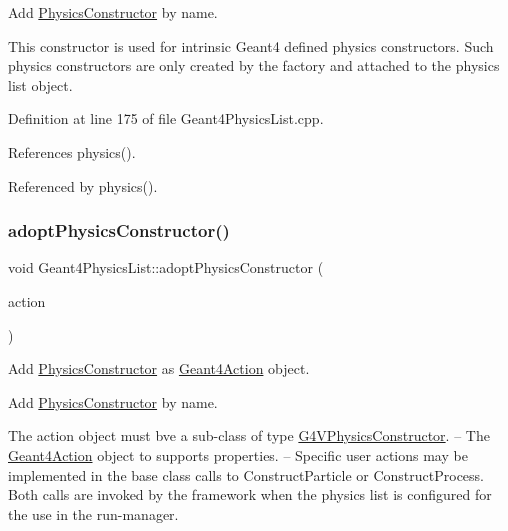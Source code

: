 Add \hyperlink{class_d_d4hep_1_1_simulation_1_1_geant4_physics_list_1_1_physics_constructor}{Physics\+Constructor} by name. 

This constructor is used for intrinsic Geant4 defined physics constructors. Such physics constructors are only created by the factory and attached to the physics list object. 

Definition at line 175 of file Geant4\+Physics\+List.\+cpp.



References physics().



Referenced by physics().

\hypertarget{class_d_d4hep_1_1_simulation_1_1_geant4_physics_list_a36fe7b7937ffd99c7300c63983d625eb}{}\label{class_d_d4hep_1_1_simulation_1_1_geant4_physics_list_a36fe7b7937ffd99c7300c63983d625eb} 
\subsubsection{\texorpdfstring{adopt\+Physics\+Constructor()}{adoptPhysicsConstructor()}}
{\footnotesize\ttfamily void Geant4\+Physics\+List\+::adopt\+Physics\+Constructor (\begin{DoxyParamCaption}\item[{\hyperlink{class_d_d4hep_1_1_simulation_1_1_geant4_action}{Geant4\+Action} $\ast$}]{action }\end{DoxyParamCaption})}



Add \hyperlink{class_d_d4hep_1_1_simulation_1_1_geant4_physics_list_1_1_physics_constructor}{Physics\+Constructor} as \hyperlink{class_d_d4hep_1_1_simulation_1_1_geant4_action}{Geant4\+Action} object. 

Add \hyperlink{class_d_d4hep_1_1_simulation_1_1_geant4_physics_list_1_1_physics_constructor}{Physics\+Constructor} by name.

The action object must bve a sub-\/class of type \hyperlink{class_g4_v_physics_constructor}{G4\+V\+Physics\+Constructor}. -- The \hyperlink{class_d_d4hep_1_1_simulation_1_1_geant4_action}{Geant4\+Action} object to supports properties. -- Specific user actions may be implemented in the base class calls to \textquotesingle{}Construct\+Particle\textquotesingle{} or \textquotesingle{}Construct\+Process\textquotesingle{}. Both calls are invoked by the framework when the physics list is configured for the use in the run-\/manager. 

